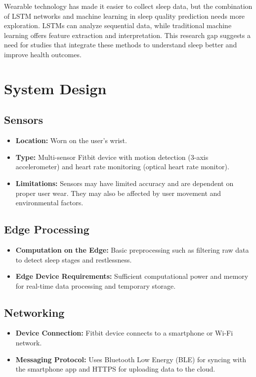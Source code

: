 \documentclass[10pt]{extarticle}
\begin{document}
Wearable technology has made it easier to collect sleep data, but the combination of LSTM networks and machine learning in sleep quality prediction needs more exploration. LSTMs can analyze sequential data, while traditional machine learning offers feature extraction and interpretation. This research gap suggests a need for studies that integrate these methods to understand sleep better and improve health outcomes.

\section{System Design}

\subsection{Sensors}
\begin{itemize}
    \item \textbf{Location:} Worn on the user's wrist.
    \item \textbf{Type:} Multi-sensor Fitbit device with motion detection (3-axis accelerometer) and heart rate monitoring (optical heart rate monitor).
    \item \textbf{Limitations:} Sensors may have limited accuracy and are dependent on proper user wear. They may also be affected by user movement and environmental factors.
\end{itemize}

\subsection{Edge Processing}
\begin{itemize}
    \item \textbf{Computation on the Edge:} Basic preprocessing such as filtering raw data to detect sleep stages and restlessness.
    \item \textbf{Edge Device Requirements:} Sufficient computational power and memory for real-time data processing and temporary storage.
\end{itemize}

\subsection{Networking}
\begin{itemize}
    \item \textbf{Device Connection:} Fitbit device connects to a smartphone or Wi-Fi network.
    \item \textbf{Messaging Protocol:} Uses Bluetooth Low Energy (BLE) for syncing with the smartphone app and HTTPS for uploading data to the cloud.
\end{itemize}
\end{document}

